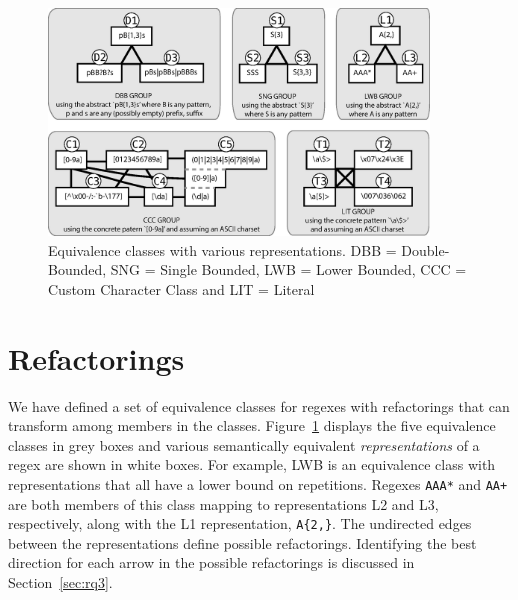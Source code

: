



\begin{figure}[tb]
\centering
\includegraphics[width=0.9\textwidth]{illustrations/refactoringTree.eps}
\vspace{-12pt}
\caption{Equivalence classes with various representations. DBB = Double-Bounded, SNG = Single Bounded, LWB = Lower Bounded, CCC = Custom Character Class and LIT = Literal}
\vspace{-6pt}
\label{fig:refactoringTree}
\end{figure}




\section{Refactorings}
\label{sec:refactoring}
We have defined a set of equivalence classes for regexes with refactorings that can transform among members in the classes.
Figure~\ref{fig:refactoringTree} displays the five equivalence classes in grey boxes and various semantically equivalent \emph{representations} of a regex are shown in white boxes. For example, LWB is an equivalence class with representations that all have a lower bound on repetitions. Regexes \verb!AAA*! and \verb!AA+!  are both members of this class mapping to representations L2 and L3, respectively, along with the L1 representation, \verb!A{2,}!.
The undirected edges between the representations define possible refactorings.
Identifying the best direction for each arrow in the possible refactorings is discussed in Section~\ref{sec:rq3}.

